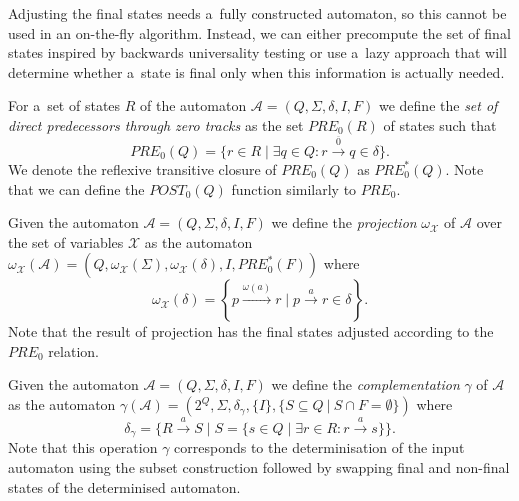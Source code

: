 Adjusting the final states needs a~fully constructed automaton, so this cannot
be used in an on-the-fly algorithm. Instead, we can either precompute the set of
final states inspired by backwards universality testing
\cite{backwards-universality} or use a~lazy approach that will determine whether a~state is final only when this
information is actually needed.

\begin{defz}
For a~set of states $R$ of the automaton $\mathcal{A} = (Q, \Sigma, \delta, I,
F)$ we define the \emph{set of direct predecessors through zero tracks} as the
set $\mathit{PRE}_0(R)$ of states such that
\begin{equation}
 \mathit{PRE}_0(Q) = \{r \in R \mid \exists q \in Q: r
 \overset{\overline{0}}{\longrightarrow} q \in \delta\}.
\end{equation}
We denote the reflexive transitive closure of $\mathit{PRE}_0(Q)$ as
$\mathit{PRE}_0^*(Q)$.
Note that we can define the $\mathit{POST}_0(Q)$ function similarly to
$\mathit{PRE}_0$.
\end{defz}

\begin{defz}
 Given the automaton $\mathcal{A} = (Q, \Sigma, \delta, I, F)$ we define the
 \emph{projection} $\omega_\mathcal{X}$ of $\mathcal{A}$ over the set of
 variables $\mathcal{X}$ as the automaton $\omega_\mathcal{X}(\mathcal{A}) = (Q,
 \omega_{\mathcal{X}}(\Sigma), \omega_{\mathcal{X}}(\delta), I,
 \mathit{PRE}_0^*(F))$ where
 \begin{equation}
  \omega_{\mathcal{X}}(\delta) = \left\{ p \overset{\omega(a)}{\longrightarrow}
  r \mid p \overset{a}{\rightarrow} r \in \delta\right\}.
 \end{equation}
 Note that the result of projection has the final states adjusted
 according to the $\mathit{PRE}_0$ relation.
\end{defz}

\begin{defz}
 Given the automaton $\mathcal{A} = (Q, \Sigma, \delta, I, F)$ we define the
 \emph{complementation} $\gamma$ of $\mathcal{A}$ as the automaton
 $\gamma(\mathcal{A}) = (2^Q, \Sigma, \delta_\gamma, \{I\}, \{S \subseteq Q\
 |\ S \cap F = \emptyset\})$ where
 \begin{equation}
  \delta_\gamma = \{R \overset{a}{\rightarrow} S \mid S = \{s \in Q \mid \exists
  r \in R: r \overset{a}{\rightarrow} s\}\}.
 \end{equation}
 Note that this operation $\gamma$ corresponds to the determinisation of the
 input automaton using the subset construction followed by swapping final and
 non-final states of the determinised automaton.
\end{defz}

